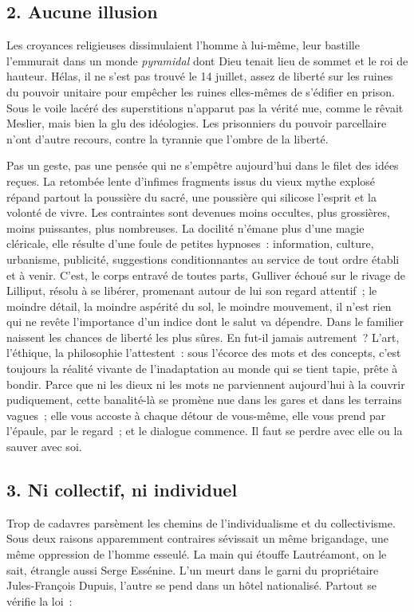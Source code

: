 \documentclass[french,twoside]{book} %
\begin{document}
\subsection[{2. Aucune illusion}]{\textsc{2.} Aucune illusion}
\noindent Les croyances religieuses dissimulaient l’homme à lui-même, leur bastille l’emmurait dans un monde \emph{pyramidal} dont Dieu tenait lieu de sommet et le roi de hauteur. Hélas, il ne s’est pas trouvé le 14 juillet, assez de liberté sur les ruines du pouvoir unitaire pour empêcher les ruines elles-mêmes de s’édifier en prison. Sous le voile lacéré des superstitions n’apparut pas la vérité nue, comme le rêvait Meslier, mais bien la glu des idéologies. Les prisonniers du pouvoir parcellaire n’ont d’autre recours, contre la tyrannie que l’ombre de la liberté.\par
Pas un geste, pas une pensée qui ne s’empêtre aujourd’hui dans le filet des idées reçues. La retombée lente d’infimes fragments issus du vieux mythe explosé répand partout la poussière du sacré, une poussière qui silicose l’esprit et la volonté de vivre. Les contraintes sont devenues moins occultes, plus grossières, moins puissantes, plus nombreuses. La docilité n’émane plus d’une magie cléricale, elle résulte d’une foule de petites hypnoses : information, culture, urbanisme, publicité, suggestions conditionnantes au service de tout ordre établi et à venir. C’est, le corps entravé de toutes parts, Gulliver échoué sur le rivage de Lilliput, résolu à se libérer, promenant autour de lui son regard attentif ; le moindre détail, la moindre aspérité du sol, le moindre mouvement, il n’est rien qui ne revête l’importance d’un indice dont le salut va dépendre. Dans le familier naissent les chances de liberté les plus sûres. En fut-il jamais autrement ? L’art, l’éthique, la philosophie l’attestent : sous l’écorce des mots et des concepts, c’est toujours la réalité vivante de l’inadaptation au monde qui se tient tapie, prête à bondir. Parce que ni les dieux ni les mots ne parviennent aujourd’hui à la couvrir pudiquement, cette banalité-là se promène nue dans les gares et dans les terrains vagues ; elle vous accoste à chaque détour de vous-même, elle vous prend par l’épaule, par le regard ; et le dialogue commence. Il faut se perdre avec elle ou la sauver avec soi.
\subsection[{3. Ni collectif, ni individuel}]{\textsc{3. } Ni collectif, ni individuel}
\noindent Trop de cadavres parsèment les chemins de l’individualisme et du collectivisme. Sous deux raisons apparemment contraires sévissait un même brigandage, une même oppression de l’homme esseulé. La main qui étouffe Lautréamont, on le sait, étrangle aussi Serge Essénine. L’un meurt dans le garni du propriétaire Jules-François Dupuis, l’autre se pend dans un hôtel nationalisé. Partout se vérifie la loi :\par
\end{document}
